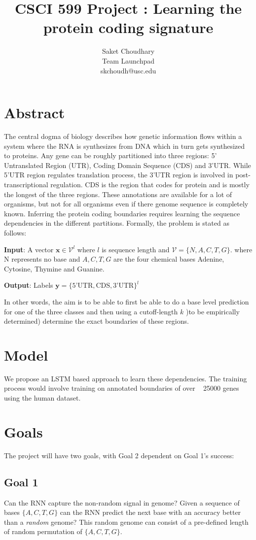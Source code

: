 \documentclass[11pt]{article}
\title{CSCI 599 Project : Learning the protein coding signature}
\author{Saket Choudhary\\ Team Launchpad \\ skchoudh@usc.edu}
\begin{document}
\maketitle 
\section*{Abstract} 
The central dogma of biology describes how genetic information flows within a system where the RNA is synthesizes from DNA which in turn gets synthesized to proteins. Any gene can be roughly partitioned into three regions: 5' Untranslated Region (UTR), Coding Domain Sequence (CDS) and 3'UTR. While 5'UTR region regulates translation process, the 3'UTR region is involved in post-transcriptional regulation. CDS is the region that codes for protein and is mostly the longest of the three regions. These annotations are available for a lot of organisms, but  not for all organisms even if there genome sequence is completely known. Inferring the protein coding boundaries requires learning the sequence dependencies in the different partitions. Formally, the problem is stated as follows:

\textbf{Input}: A vector $\mathbf{x} \in \mathcal{V}^l$ where $l$ is sequence length  and $\mathcal{V} = \{N, A, C, T, G \}$. where N represents no base and $A,C,T,G$ are the four chemical bases Adenine, Cytosine, Thymine and Guanine.

\textbf{Output}: Labels $\mathbf{y} = \{ \text{5'UTR}, \text{CDS}, \text{3'UTR} \}^l$

In other words, the aim is to be able to first be able to do a base level prediction for one of the three classes and then using a cutoff-length $k$ )to be empirically determined) determine the exact boundaries of these regions.

\section*{Model}
We propose an LSTM based approach to learn these dependencies. The training process would involve training on annotated boundaries of over ~ 25000 genes using the human dataset. 

\section*{Goals}
The project will have two goals, with Goal 2 dependent on Goal 1's success:

\subsection*{Goal 1}
Can the RNN capture the non-random signal in genome? Given a sequence of bases $\{A, C, T, G\}$ can the RNN predict the next base with an accuracy better than a \textit{random} genome? This random genome can consist of a pre-defined length of random permutation of $\{A, C, T, G\}$.
\end{document}
